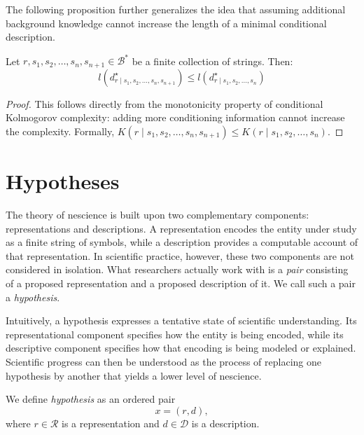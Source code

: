 The following proposition further generalizes the idea that assuming additional background knowledge cannot increase the length of a minimal conditional description.

\begin{proposition}
Let $r, s_1, s_2, \ldots, s_n, s_{n+1} \in \mathcal{B}^\ast$ be a finite collection of strings. Then:
\[
l \left( d^\star_{r \mid s_1, s_2, \ldots, s_n, s_{n+1}} \right) \leq l \left( d^\star_{r \mid s_1, s_2, \ldots, s_n} \right)
\]
\end{proposition}
\begin{proof}
This follows directly from the monotonicity property of conditional Kolmogorov complexity: adding more conditioning information cannot increase the complexity. Formally, $K(r \mid s_1, s_2, \ldots, s_n, s_{n+1}) \leq K(r \mid s_1, s_2, \ldots, s_n)$.
\end{proof}

%
%

\section{Hypotheses}
\label{sec:hypotheses}

The theory of nescience is built upon two complementary components: representations and descriptions. A representation encodes the entity under study as a finite string of symbols, while a description provides a computable account of that representation. In scientific practice, however, these two components are not considered in isolation. What researchers actually work with is a \emph{pair} consisting of a proposed representation and a proposed description of it. We call such a pair a \emph{hypothesis}.

Intuitively, a hypothesis expresses a tentative state of scientific understanding. Its representational component specifies how the entity is being encoded, while its descriptive component specifies how that encoding is being modeled or explained. Scientific progress can then be understood as the process of replacing one hypothesis by another that yields a lower level of nescience.

\begin{definition}
\label{def:hypothesis}
We define \emph{hypothesis} as an ordered pair
\[
x = (r,d),
\]
where \(r \in \mathcal{R}\) is a representation and \(d \in \mathcal{D}\) is a description.
\end{definition}

